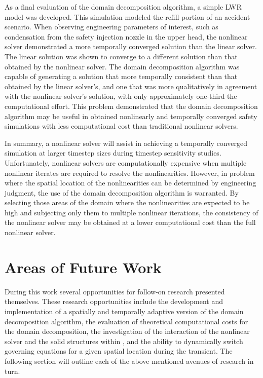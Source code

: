 As a final evaluation of the domain decomposition algorithm, a simple LWR model was developed.
This simulation modeled the refill portion of an accident scenario.
When observing engineering parameters of interest, such as condensation from the safety injection nozzle in the upper head, the nonlinear solver demonstrated a more temporally converged solution than the linear solver.
The linear solution was shown to converge to a different solution than that obtained by the nonlinear solver.
The domain decomposition algorithm was capable of generating a solution that more temporally consistent than that obtained by the linear solver's, and one that was more qualitatively in agreement with the nonlinear solver's solution, with only approximately one-third the computational effort.
This problem demonstrated that the domain decomposition algorithm may be useful in obtained nonlinearly and temporally converged safety simulations with less computational cost than traditional nonlinear solvers.

In summary, a nonlinear solver will assist in achieving a temporally converged simulation at larger timestep sizes during timestep sensitivity studies.
Unfortunately, nonlinear solvers are computationally expensive when multiple nonlinear iterates are required to resolve the nonlinearities.
However, in problem where the spatial location of the nonlinearities can be determined by engineering judgment, the use of the domain decomposition algorithm is warranted.
By selecting those areas of the domain where the nonlinearities are expected to be high and subjecting only them to multiple nonlinear iterations, the consistency of the nonlinear solver may be obtained at a lower computational cost than the full nonlinear solver.

\section{Areas of Future Work}
\label{sect:futureWork}
During this work several opportunities for follow-on research presented themselves.
These research opportunities include the development and implementation of a spatially and temporally adaptive version of the domain decomposition algorithm, the evaluation of theoretical computational costs for the domain decomposition, the investigation of the interaction of the nonlinear solver and the solid structures within \cobra{}, and the ability to dynamically switch governing equations for a given spatial location during the transient.
The following section will outline each of the above mentioned avenues of research in turn.

